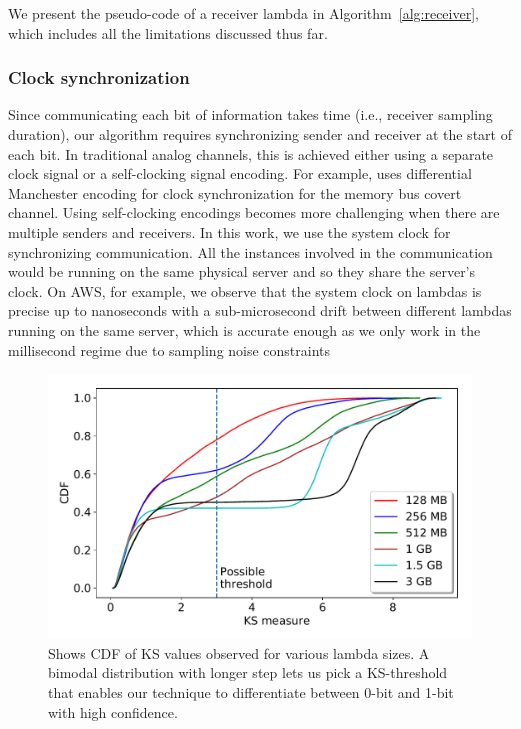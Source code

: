We present the pseudo-code of a receiver lambda in Algorithm~\ref{alg:receiver},
which includes all the limitations discussed thus far.

\subsubsection{Clock synchronization} 
Since communicating each bit of information takes time (i.e., receiver sampling
duration), our algorithm requires synchronizing sender and receiver at the start
of each bit. In traditional analog channels, this is achieved either using a
separate clock signal or a self-clocking signal encoding. For example,
\cite{whispers} uses differential Manchester encoding for clock synchronization
for the memory bus covert channel. Using self-clocking encodings becomes more 
challenging when there are multiple senders and receivers. In this
work, we use the system clock for synchronizing communication.
All the instances involved in the communication would be running on the same
physical server and so they share the server's clock. On AWS, for example,
we observe that the system clock on lambdas is precise up to nanoseconds with 
a sub-microsecond drift between different lambdas running on the same server, 
which is accurate enough as we only work in the millisecond regime due to sampling noise
constraints


\begin{figure}[!t]
  \includegraphics[width=.99\linewidth]{fig/ksvalues.pdf}
  \caption{Shows CDF of KS values observed for various lambda sizes. A bimodal distribution 
  with longer step lets us pick a KS-threshold that enables our technique to differentiate 
  between 0-bit and 1-bit with high confidence. 
\label{fig:ks_values}}
\end{figure}

